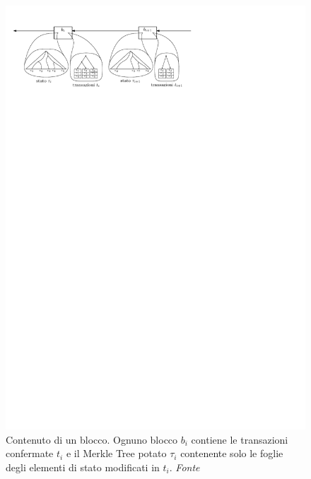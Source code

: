 \begin{figure}
	\centering
	\includegraphics{img/capdue/block_bern.pdf}
	\caption{Contenuto di un blocco. Ognuno blocco $b_i$ contiene le transazioni confermate $t_i$ e il Merkle Tree potato $\tau_i$ contenente solo le foglie degli elementi di stato modificati in $t_i$. \emph{Fonte~\cite{bernardini2019blockchains}}}
	\label{fig:block_content}
\end{figure}

